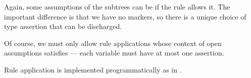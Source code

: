 \begin{definition}
\begin{thmenum}[resume=def:type_derivation_tree]
    Again, some assumptions of the subtrees can be  if the rule allows it. The important difference is that we have no markers, so there is a unique choice of type assertion that can be discharged.

    Of course, we must only allow rule applications whose context of open assumptions satisfies  --- each variable must have at most one assertion.
  \end{thmenum}
\end{definition}
\begin{comments}
  \item Rule application is implemented programmatically as  in \cite{notebook:code}.
\end{comments}

